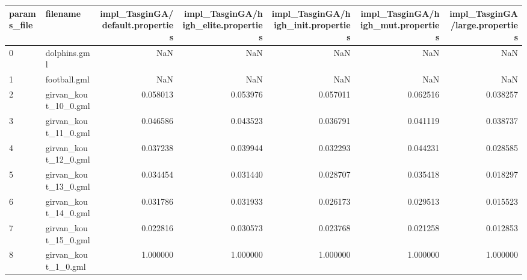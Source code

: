 \begin{tabular}{llrrrrr}
\toprule
params\_file &                    filename &  impl\_TasginGA/default.properties &  impl\_TasginGA/high\_elite.properties &  impl\_TasginGA/high\_init.properties &  impl\_TasginGA/high\_mut.properties &  impl\_TasginGA/large.properties \\
\midrule
0  &                dolphins.gml &                               NaN &                                  NaN &                                 NaN &                                NaN &                             NaN \\
1  &                football.gml &                               NaN &                                  NaN &                                 NaN &                                NaN &                             NaN \\
2  &        girvan\_kout\_10\_0.gml &                          0.058013 &                             0.053976 &                            0.057011 &                           0.062516 &                        0.038257 \\
3  &        girvan\_kout\_11\_0.gml &                          0.046586 &                             0.043523 &                            0.036791 &                           0.041119 &                        0.038737 \\
4  &        girvan\_kout\_12\_0.gml &                          0.037238 &                             0.039944 &                            0.032293 &                           0.044231 &                        0.028585 \\
5  &        girvan\_kout\_13\_0.gml &                          0.034454 &                             0.031440 &                            0.028707 &                           0.035418 &                        0.018297 \\
6  &        girvan\_kout\_14\_0.gml &                          0.031786 &                             0.031933 &                            0.026173 &                           0.029513 &                        0.015523 \\
7  &        girvan\_kout\_15\_0.gml &                          0.022816 &                             0.030573 &                            0.023768 &                           0.021258 &                        0.012853 \\
8  &         girvan\_kout\_1\_0.gml &                          1.000000 &                             1.000000 &                            1.000000 &                           1.000000 &                        1.000000 \\

\end{tabular}
